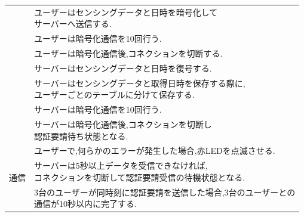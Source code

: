 \begin{table}[H]
{\begin{tabular}{|c|l|}
 & \shortstack[l]{
   ユーザーはセンシングデータと日時を暗号化して\\
   サーバーへ送信する.}\\ \cline{2-2}
 & ユーザーは暗号化通信を10回行う.\\ \cline{2-2}
 & ユーザーは暗号化通信後,コネクションを切断する.\\ \cline{2-2}
 & サーバーはセンシングデータと日時を復号する.\\ \cline{2-2}
 & \shortstack[l]{
   サーバーはセンシングデータと取得日時を保存する際に,\\
   ユーザーごとのテーブルに分けて保存する.} \\ \cline{2-2}
 & サーバーは暗号化通信を10回行う.\\ \cline{2-2}
 & \shortstack[l]{
  サーバーは暗号化通信後,コネクションを切断し\\
   認証要請待ち状態となる.}\\ \hline
\multirow{3}{*}{通信}
& ユーザーで,何らかのエラーが発生した場合,赤LEDを点滅させる.\\ \cline{2-2}
& \shortstack[l]{
   サーバーは5秒以上データを受信できなければ,\\
   コネクションを切断して認証要請受信の待機状態となる.}\\ \cline{2-2}
& \shortstack[l]{
   3台のユーザーが同時刻に認証要請を送信した場合,3台のユーザーとの\\
   通信が10秒以内に完了する.}\\ \hline
\end{tabular}
}
\end{table}
